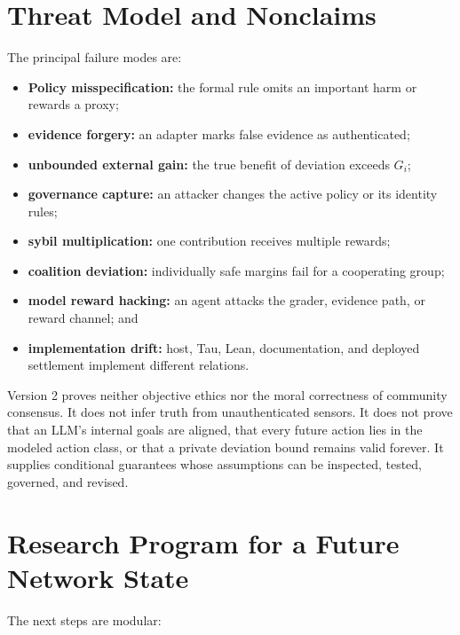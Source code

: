 \documentclass[11pt]{article}
\begin{document}
\section{Threat Model and Nonclaims}

The principal failure modes are:

\begin{itemize}
  \item \textbf{Policy misspecification:} the formal rule omits an important
  harm or rewards a proxy;
  \item \textbf{evidence forgery:} an adapter marks false evidence as
  authenticated;
  \item \textbf{unbounded external gain:} the true benefit of deviation exceeds
  $G_i$;
  \item \textbf{governance capture:} an attacker changes the active policy or
  its identity rules;
  \item \textbf{sybil multiplication:} one contribution receives multiple
  rewards;
  \item \textbf{coalition deviation:} individually safe margins fail for a
  cooperating group;
  \item \textbf{model reward hacking:} an agent attacks the grader, evidence
  path, or reward channel; and
  \item \textbf{implementation drift:} host, Tau, Lean, documentation, and
  deployed settlement implement different relations.
\end{itemize}

Version 2 proves neither objective ethics nor the moral correctness of community
consensus.  It does not infer truth from unauthenticated sensors.  It does not
prove that an LLM's internal goals are aligned, that every future action lies in
the modeled action class, or that a private deviation bound remains valid
forever.  It supplies conditional guarantees whose assumptions can be inspected,
tested, governed, and revised.

\section{Research Program for a Future Network State}

The next steps are modular:
\end{document}
